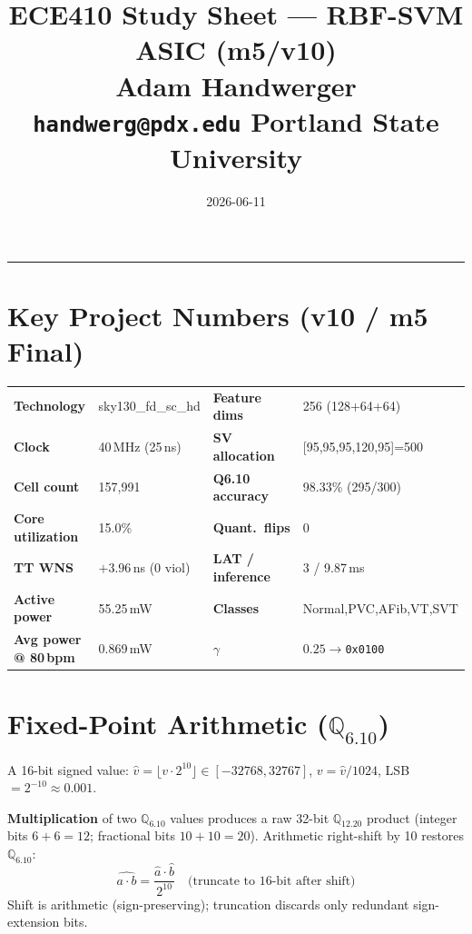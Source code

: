 \documentclass[10pt]{article}
\title{\textbf{ECE410 Study Sheet --- RBF-SVM ASIC (m5/v10)}\\[-0.2em]
       \normalsize Adam Handwerger \quad \texttt{handwerg@pdx.edu} \quad Portland State University}
\date{2026-06-11}
\begin{document}
\maketitle
\vspace{-1em}
\noindent\rule{\linewidth}{0.5pt}
\vspace{-0.5em}

\section{Key Project Numbers (v10 / m5 Final)}

\begin{center}
\small
\begin{tabular}{@{}ll@{\hspace{2.5em}}ll@{}}
\textbf{Technology} & sky130\_fd\_sc\_hd & \textbf{Feature dims} & 256 (128+64+64) \\
\textbf{Clock} & 40\,MHz (25\,ns) & \textbf{SV allocation} & [95,95,95,120,95]=500 \\
\textbf{Cell count} & 157,991 & \textbf{Q6.10 accuracy} & 98.33\% (295/300) \\
\textbf{Core utilization} & 15.0\% & \textbf{Quant.\ flips} & 0 \\
\textbf{TT WNS} & $+3.96$\,ns (0 viol) & \textbf{LAT / inference} & 3 / 9.87\,ms \\
\textbf{Active power} & 55.25\,mW & \textbf{Classes} & Normal,PVC,AFib,VT,SVT \\
\textbf{Avg power @ 80\,bpm} & 0.869\,mW & \textbf{$\gamma$} & $0.25\to$\texttt{0x0100} \\
\end{tabular}
\end{center}

\section{Fixed-Point Arithmetic (\(\mathbb{Q}_{6.10}\))}

A 16-bit signed value: $\hat{v} = \lfloor v \cdot 2^{10} \rfloor \in [-32768, 32767]$,
$v = \hat{v}/1024$, LSB $= 2^{-10}\approx 0.001$.

\textbf{Multiplication} of two $\mathbb{Q}_{6.10}$ values produces a raw 32-bit
$\mathbb{Q}_{12.20}$ product (integer bits $6{+}6=12$; fractional bits $10{+}10=20$).
Arithmetic right-shift by 10 restores $\mathbb{Q}_{6.10}$:
\[
    \widehat{a \cdot b} = \frac{\hat{a}\cdot\hat{b}}{2^{10}} \quad\text{(truncate to 16-bit after shift)}
\]
Shift is arithmetic (sign-preserving); truncation discards only redundant sign-extension bits.
\end{document}
